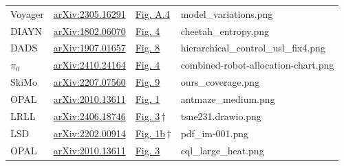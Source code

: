 \documentclass[acmsmall,review,anonymous]{acmart}
\begin{document}
\begin{table}[t]
\begin{tabular}{@{}llll@{}}
Voyager & \href{https://arxiv.org/abs/2305.16291}{arXiv:2305.16291} & \href{https://arxiv.org/abs/2305.16291}{Fig. A.4} & model\_variations.png \\
DIAYN & \href{https://arxiv.org/abs/1802.06070}{arXiv:1802.06070} & \href{https://arxiv.org/abs/1802.06070}{Fig. 4} & cheetah\_entropy.png \\
DADS & \href{https://arxiv.org/abs/1907.01657}{arXiv:1907.01657} & \href{https://arxiv.org/abs/1907.01657}{Fig. 8} & hierarchical\_control\_usl\_fix4.png \\
$\pi_0$ & \href{https://arxiv.org/abs/2410.24164}{arXiv:2410.24164} & \href{https://arxiv.org/abs/2410.24164}{Fig. 4} & combined-robot-allocation-chart.png \\
SkiMo & \href{https://arxiv.org/abs/2207.07560}{arXiv:2207.07560} & \href{https://arxiv.org/abs/2207.07560}{Fig. 9} & ours\_coverage.png \\
OPAL & \href{https://arxiv.org/abs/2010.13611}{arXiv:2010.13611} & \href{https://arxiv.org/abs/2010.13611}{Fig. 1} & antmaze\_medium.png \\
LRLL & \href{https://arxiv.org/abs/2406.18746}{arXiv:2406.18746} & \href{https://arxiv.org/abs/2406.18746}{Fig. 3}\,$\dagger$ & tsne231.drawio.png \\
LSD & \href{https://arxiv.org/abs/2202.00914}{arXiv:2202.00914} & \href{https://arxiv.org/abs/2202.00914}{Fig. 1b}\,$\dagger$ & pdf\_im-001.png \\
OPAL & \href{https://arxiv.org/abs/2010.13611}{arXiv:2010.13611} & \href{https://arxiv.org/abs/2010.13611}{Fig. 3} & cql\_large\_heat.png \\
\bottomrule
\end{tabular}
\end{table}
%
\end{document}
